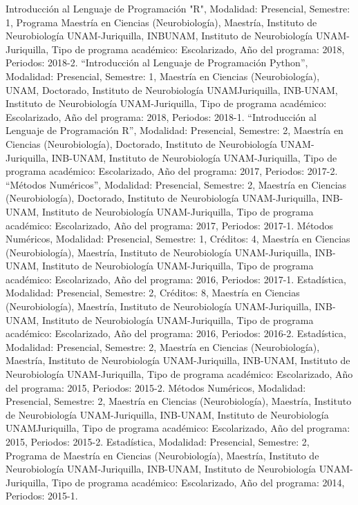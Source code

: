 Introducción al Lenguaje de Programación "R", Modalidad: Presencial, Semestre: 1, Programa Maestría en Ciencias (Neurobiología), Maestría, Instituto de Neurobiología UNAM-Juriquilla, INBUNAM, Instituto de Neurobiología UNAM-Juriquilla, Tipo de programa académico: Escolarizado, Año del programa: 2018, Periodos: 2018-2.
“Introducción al Lenguaje de Programación Python”, Modalidad: Presencial, Semestre: 1, Maestría en Ciencias (Neurobiología), UNAM, Doctorado, Instituto de Neurobiología UNAMJuriquilla, INB-UNAM, Instituto de Neurobiología UNAM-Juriquilla, Tipo de programa académico: Escolarizado, Año del programa: 2018, Periodos: 2018-1.
“Introducción al Lenguaje de Programación R”, Modalidad: Presencial, Semestre: 2, Maestría en Ciencias (Neurobiología), Doctorado, Instituto de Neurobiología UNAM-Juriquilla, INB-UNAM, Instituto de Neurobiología UNAM-Juriquilla, Tipo de programa académico: Escolarizado, Año del programa: 2017, Periodos: 2017-2.
“Métodos Numéricos”, Modalidad: Presencial, Semestre: 2, Maestría en Ciencias (Neurobiología), Doctorado, Instituto de Neurobiología UNAM-Juriquilla, INB-UNAM, Instituto de Neurobiología UNAM-Juriquilla, Tipo de programa académico: Escolarizado, Año del programa: 2017, Periodos: 2017-1.
Métodos Numéricos, Modalidad: Presencial, Semestre: 1, Créditos: 4, Maestría en Ciencias (Neurobiología), Maestría, Instituto de Neurobiología UNAM-Juriquilla, INB-UNAM, Instituto de Neurobiología UNAM-Juriquilla, Tipo de programa académico: Escolarizado, Año del programa: 2016, Periodos: 2017-1.
Estadística, Modalidad: Presencial, Semestre: 2, Créditos: 8, Maestría en Ciencias (Neurobiología), Maestría, Instituto de Neurobiología UNAM-Juriquilla, INB-UNAM, Instituto de Neurobiología UNAM-Juriquilla, Tipo de programa académico: Escolarizado, Año del programa: 2016, Periodos: 2016-2.
Estadística, Modalidad: Presencial, Semestre: 2, Maestría en Ciencias (Neurobiología), Maestría, Instituto de Neurobiología UNAM-Juriquilla, INB-UNAM, Instituto de Neurobiología UNAM-Juriquilla, Tipo de programa académico: Escolarizado, Año del programa: 2015, Periodos: 2015-2.
Métodos Numéricos, Modalidad: Presencial, Semestre: 2, Maestría en Ciencias (Neurobiología), Maestría, Instituto de Neurobiología UNAM-Juriquilla, INB-UNAM, Instituto de Neurobiología UNAMJuriquilla, Tipo de programa académico: Escolarizado, Año del programa: 2015, Periodos: 2015-2.
Estadística, Modalidad: Presencial, Semestre: 2, Programa de Maestría en Ciencias (Neurobiología), Maestría, Instituto de Neurobiología UNAM-Juriquilla, INB-UNAM, Instituto de Neurobiología UNAM-Juriquilla, Tipo de programa académico: Escolarizado, Año del programa: 2014, Periodos: 2015-1.
